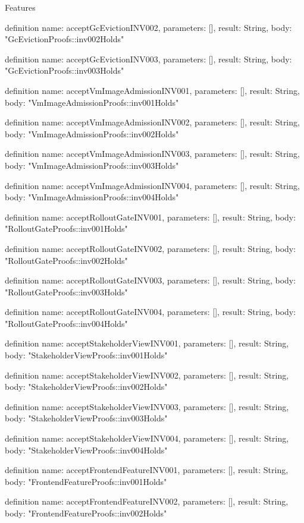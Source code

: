 \begin{lexlean}{Features}
\begin{semanticmodule}
definition{
  name: acceptGcEvictionINV002,
  parameters: [],
  result: String,
  body: "GcEvictionProofs::inv002Holds"
}

definition{
  name: acceptGcEvictionINV003,
  parameters: [],
  result: String,
  body: "GcEvictionProofs::inv003Holds"
}

definition{
  name: acceptVmImageAdmissionINV001,
  parameters: [],
  result: String,
  body: "VmImageAdmissionProofs::inv001Holds"
}

definition{
  name: acceptVmImageAdmissionINV002,
  parameters: [],
  result: String,
  body: "VmImageAdmissionProofs::inv002Holds"
}

definition{
  name: acceptVmImageAdmissionINV003,
  parameters: [],
  result: String,
  body: "VmImageAdmissionProofs::inv003Holds"
}

definition{
  name: acceptVmImageAdmissionINV004,
  parameters: [],
  result: String,
  body: "VmImageAdmissionProofs::inv004Holds"
}

definition{
  name: acceptRolloutGateINV001,
  parameters: [],
  result: String,
  body: "RolloutGateProofs::inv001Holds"
}

definition{
  name: acceptRolloutGateINV002,
  parameters: [],
  result: String,
  body: "RolloutGateProofs::inv002Holds"
}

definition{
  name: acceptRolloutGateINV003,
  parameters: [],
  result: String,
  body: "RolloutGateProofs::inv003Holds"
}

definition{
  name: acceptRolloutGateINV004,
  parameters: [],
  result: String,
  body: "RolloutGateProofs::inv004Holds"
}

definition{
  name: acceptStakeholderViewINV001,
  parameters: [],
  result: String,
  body: "StakeholderViewProofs::inv001Holds"
}

definition{
  name: acceptStakeholderViewINV002,
  parameters: [],
  result: String,
  body: "StakeholderViewProofs::inv002Holds"
}

definition{
  name: acceptStakeholderViewINV003,
  parameters: [],
  result: String,
  body: "StakeholderViewProofs::inv003Holds"
}

definition{
  name: acceptStakeholderViewINV004,
  parameters: [],
  result: String,
  body: "StakeholderViewProofs::inv004Holds"
}

definition{
  name: acceptFrontendFeatureINV001,
  parameters: [],
  result: String,
  body: "FrontendFeatureProofs::inv001Holds"
}

definition{
  name: acceptFrontendFeatureINV002,
  parameters: [],
  result: String,
  body: "FrontendFeatureProofs::inv002Holds"
}


\end{semanticmodule}
\end{lexlean}
